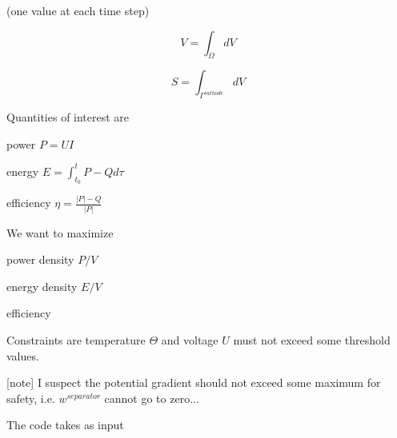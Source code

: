 \documentclass[10pt, oneside]{article}   	%
\begin{document}
(one value at each time step)

\begin{equation}
V = \int_\Omega dV
\end{equation}

\begin{equation}
S = \int_{\Gamma^{cathode}} dV
\end{equation}

Quantities of interest are 

power $P=UI$

energy $E=\int_{t_0}^t P - Q d\tau$

efficiency $\eta=\frac{|P|-Q}{|P|}$

We want to maximize 

power density $P/V$

energy density $E/V$

efficiency

Constraints are 
temperature $\Theta$ and voltage $U$ must not exceed some threshold values.

[note] 
I suspect the potential gradient should not exceed some maximum for safety,
i.e. $w^{separator}$ cannot go to zero...

The code takes as input
\end{document}
